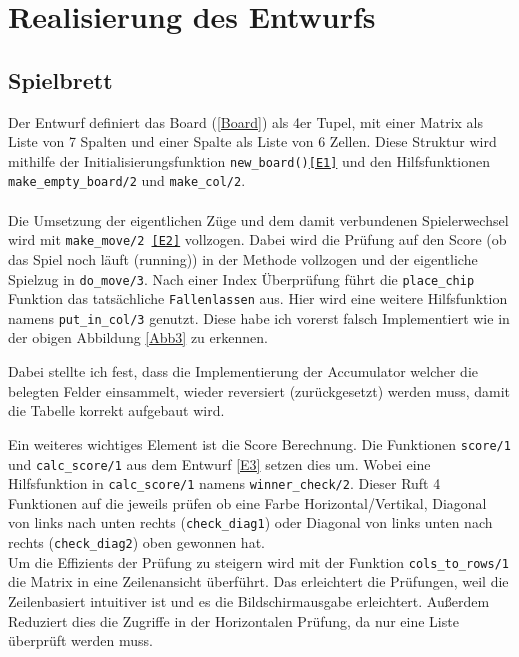 %

\section{Realisierung des Entwurfs}

\subsection{Spielbrett}

Der Entwurf definiert das Board (\ref{Board}) als 4er Tupel, mit einer Matrix als Liste von 7 Spalten und einer Spalte als Liste von 6 Zellen. Diese Struktur wird mithilfe der Initialisierungsfunktion \texttt{new\_board()\ref{E1}} und den Hilfsfunktionen \texttt{make\_empty\_board/2} und \texttt{make\_col/2}. 
\\\\
Die Umsetzung der eigentlichen Züge und dem damit verbundenen Spielerwechsel wird mit \texttt{make\_move/2 \ref{E2}} vollzogen. Dabei wird die Prüfung auf den Score (ob das Spiel noch läuft (running)) in der Methode vollzogen und der eigentliche Spielzug in \texttt{do\_move/3}. Nach einer Index Überprüfung führt die \texttt{place\_chip} Funktion das tatsächliche \texttt{Fallenlassen} aus. Hier wird eine weitere Hilfsfunktion namens \texttt{put\_in\_col/3} genutzt. Diese habe ich vorerst falsch Implementiert wie in der obigen Abbildung \ref{Abb3} zu erkennen.

\label{Abb3}

Dabei stellte ich fest, dass die Implementierung der Accumulator welcher die belegten Felder einsammelt, wieder reversiert (zurückgesetzt) werden muss, damit die Tabelle korrekt aufgebaut wird.

Ein weiteres wichtiges Element ist die Score Berechnung. Die Funktionen \texttt{score/1} und \texttt{calc\_score/1} aus dem Entwurf \ref{E3} setzen dies um. Wobei eine Hilfsfunktion in \texttt{calc\_score/1} namens \texttt{winner\_check/2}. Dieser Ruft 4 Funktionen auf die jeweils prüfen ob eine Farbe Horizontal/Vertikal, Diagonal von links nach unten rechts (\texttt{check\_diag1}) oder Diagonal von links unten nach rechts (\texttt{check\_diag2}) oben gewonnen hat.
\\
Um die Effizients der Prüfung zu steigern wird mit der Funktion \texttt{cols\_to\_rows/1} die Matrix in eine Zeilenansicht überführt. Das erleichtert die Prüfungen, weil die Zeilenbasiert intuitiver ist und es die Bildschirmausgabe erleichtert. Außerdem Reduziert dies die Zugriffe in der Horizontalen Prüfung, da nur eine Liste überprüft werden muss.

